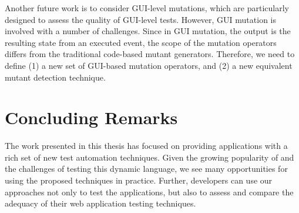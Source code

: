 Another future work is to consider GUI-level mutations, which are particularly designed to assess the quality of GUI-level tests. However, GUI mutation is involved with a number of challenges. Since in GUI mutation, the output is the resulting state from an executed event, the scope of the mutation operators differs from the traditional code-based mutant generators. Therefore, we need to define (1) a new set of GUI-based mutation operators, and (2) a new equivalent mutant detection technique.
\section{Concluding Remarks}
The work presented in this thesis has focused on providing \javascript applications with a rich set of new test automation techniques. Given the growing popularity of \javascript and the challenges of testing this dynamic language, we see many opportunities for using the proposed techniques in practice. Further, developers can use our approaches not only to test the applications, but also to assess and compare the adequacy of their web application testing techniques. 
  



